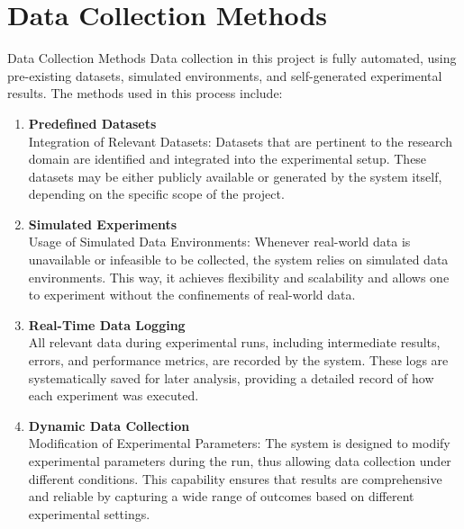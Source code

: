 \section{Data Collection Methods}
Data Collection Methods
Data collection in this project is fully automated, using pre-existing datasets, simulated environments, and self-generated experimental results. The methods used in this process include:
\begin{enumerate}
    \item \textbf{Predefined Datasets}\\
    Integration of Relevant Datasets: Datasets that are pertinent to the research domain are identified and integrated into the experimental setup. These datasets may be either publicly available or generated by the system itself, depending on the specific scope of the project.

    \item \textbf{Simulated Experiments}\\
    Usage of Simulated Data Environments: Whenever real-world data is unavailable or infeasible to be collected, the system relies on simulated data environments. This way, it achieves flexibility and scalability and allows one to experiment without the confinements of real-world data.

    \item \textbf{Real-Time Data Logging}\\
    All relevant data during experimental runs, including intermediate results, errors, and performance metrics, are recorded by the system. These logs are systematically saved for later analysis, providing a detailed record of how each experiment was executed.

    \item \textbf{Dynamic Data Collection}\\
    Modification of Experimental Parameters: The system is designed to modify experimental parameters during the run, thus allowing data collection under different conditions. This capability ensures that results are comprehensive and reliable by capturing a wide range of outcomes based on different experimental settings.
\end{enumerate}

